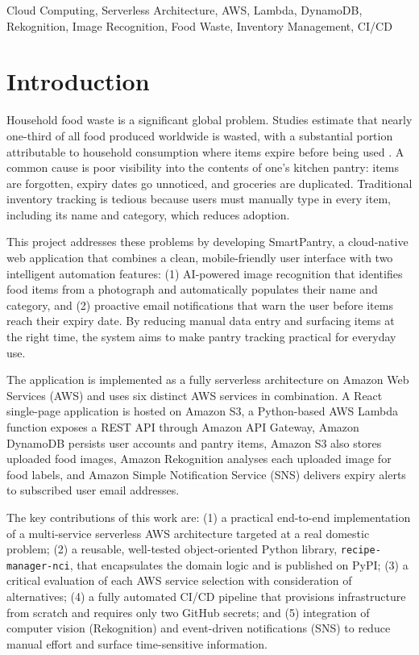 \documentclass[conference]{IEEEtran}
\begin{document}
\begin{IEEEkeywords}
Cloud Computing, Serverless Architecture, AWS, Lambda, DynamoDB, Rekognition, Image Recognition, Food Waste, Inventory Management, CI/CD
\end{IEEEkeywords}

\section{Introduction}

Household food waste is a significant global problem. Studies estimate that nearly one-third of all food produced worldwide is wasted, with a substantial portion attributable to household consumption where items expire before being used \cite{foodwaste2021}. A common cause is poor visibility into the contents of one's kitchen pantry: items are forgotten, expiry dates go unnoticed, and groceries are duplicated. Traditional inventory tracking is tedious because users must manually type in every item, including its name and category, which reduces adoption.

This project addresses these problems by developing SmartPantry, a cloud-native web application that combines a clean, mobile-friendly user interface with two intelligent automation features: (1) AI-powered image recognition that identifies food items from a photograph and automatically populates their name and category, and (2) proactive email notifications that warn the user before items reach their expiry date. By reducing manual data entry and surfacing items at the right time, the system aims to make pantry tracking practical for everyday use.

The application is implemented as a fully serverless architecture on Amazon Web Services (AWS) and uses six distinct AWS services in combination. A React single-page application is hosted on Amazon S3, a Python-based AWS Lambda function exposes a REST API through Amazon API Gateway, Amazon DynamoDB persists user accounts and pantry items, Amazon S3 also stores uploaded food images, Amazon Rekognition analyses each uploaded image for food labels, and Amazon Simple Notification Service (SNS) delivers expiry alerts to subscribed user email addresses.

The key contributions of this work are: (1) a practical end-to-end implementation of a multi-service serverless AWS architecture targeted at a real domestic problem; (2) a reusable, well-tested object-oriented Python library, \texttt{recipe-manager-nci}, that encapsulates the domain logic and is published on PyPI; (3) a critical evaluation of each AWS service selection with consideration of alternatives; (4) a fully automated CI/CD pipeline that provisions infrastructure from scratch and requires only two GitHub secrets; and (5) integration of computer vision (Rekognition) and event-driven notifications (SNS) to reduce manual effort and surface time-sensitive information.
\end{document}
